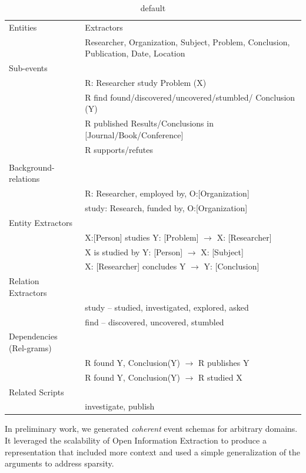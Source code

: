 \begin{table}[htdp]
\caption{default}
\begin{center}
\begin{tabular}{|p{4cm}|p{12cm}|}
\hline
Entities & Extractors\\
& Researcher, Organization, Subject, Problem, Conclusion, Publication, Date, Location \\
\hline
Sub-events &  \\
& R: Researcher study Problem (X)\\
& R find found/discovered/uncovered/stumbled/ Conclusion (Y) \\
& R published Results/Conclusions in [Journal/Book/Conference] \\
& R supports/refutes \\
& \\
\hline
Background-relations & \\
& R: Researcher, employed by, O:[Organization] \\
& study: Research, funded by, O:[Organization] \\
\hline
Entity Extractors & \\
& X:[Person] studies Y: [Problem] $\rightarrow$ X: [Researcher] \\
& X is studied by Y: [Person] $\rightarrow$ X: [Subject]\\
& X: [Researcher] concludes Y $\rightarrow$ Y: [Conclusion]\\
\hline
Relation Extractors & \\
	& study -- studied, investigated, explored, asked\\
	& find -- discovered, uncovered, stumbled \\			
\hline
Dependencies (Rel-grams) & \\
& R found Y, Conclusion(Y) $\rightarrow$ R publishes Y \\
& R found Y, Conclusion(Y) $\rightarrow$ R studied X \\	
\hline
Related Scripts & \\
& investigate, publish \\
\hline
\end{tabular}
\end{center}
\label{default}
\end{table}%


In preliminary work, we generated {\em coherent} event schemas for arbitrary domains. It leveraged the scalability of Open Information Extraction to produce a representation that included more context and used a simple generalization of the arguments to address sparsity. 

